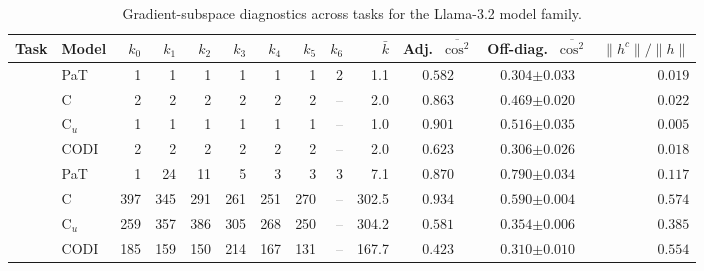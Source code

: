\begin{table}[h!]
\centering
\small
\setlength{\tabcolsep}{2.5pt}
\caption{Gradient-subspace diagnostics across tasks for the Llama-3.2 model family.}
\label{tab:subspace_geometry_llama}
\begin{tabular}{llrrrrrrrrccr}
\toprule
Task & Model & $k_{0}$ & $k_{1}$ & $k_{2}$ & $k_{3}$ & $k_{4}$ & $k_{5}$ & $k_{6}$ & $\bar k$ & Adj.\ $\overline{\cos^2}$ & Off-diag.\ $\overline{\cos^2}$ & $\|h^c\|/\|h\|$ \\
\midrule
{} & PaT & 1 & 1 & 1 & 1 & 1 & 1 & 2 & 1.1 & $0.582$ & $0.304 {\scriptstyle \pm 0.033}$ & $0.019$ \\
 & C & 2 & 2 & 2 & 2 & 2 & 2 & \textcolor{gray}{--} & 2.0 & $0.863$ & $0.469 {\scriptstyle \pm 0.020}$ & $0.022$ \\
 & C$_u$ & 1 & 1 & 1 & 1 & 1 & 1 & \textcolor{gray}{--} & 1.0 & $0.901$ & $0.516 {\scriptstyle \pm 0.035}$ & $0.005$ \\
 & CODI & 2 & 2 & 2 & 2 & 2 & 2 & \textcolor{gray}{--} & 2.0 & $0.623$ & $0.306 {\scriptstyle \pm 0.026}$ & $0.018$ \\
\midrule
{} & PaT & 1 & 24 & 11 & 5 & 3 & 3 & 3 & 7.1 & $0.870$ & $0.790 {\scriptstyle \pm 0.034}$ & $0.117$ \\
 & C & 397 & 345 & 291 & 261 & 251 & 270 & \textcolor{gray}{--} & 302.5 & $0.934$ & $0.590 {\scriptstyle \pm 0.004}$ & $0.574$ \\
 & C$_u$ & 259 & 357 & 386 & 305 & 268 & 250 & \textcolor{gray}{--} & 304.2 & $0.581$ & $0.354 {\scriptstyle \pm 0.006}$ & $0.385$ \\
 & CODI & 185 & 159 & 150 & 214 & 167 & 131 & \textcolor{gray}{--} & 167.7 & $0.423$ & $0.310 {\scriptstyle \pm 0.010}$ & $0.554$ \\
\bottomrule
\end{tabular}
\end{table}